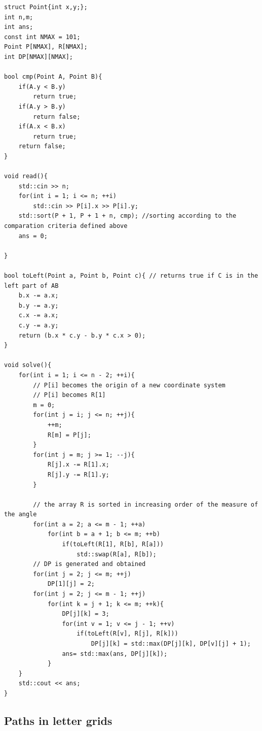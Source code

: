 \documentclass[letterpaper]{article}
\begin{document}
\begin{lstlisting}
struct Point{int x,y;};
int n,m;
int ans;
const int NMAX = 101;
Point P[NMAX], R[NMAX];
int DP[NMAX][NMAX];

bool cmp(Point A, Point B){
    if(A.y < B.y)
        return true;
    if(A.y > B.y)
        return false;
    if(A.x < B.x)
        return true;
    return false;
}

void read(){
    std::cin >> n;
    for(int i = 1; i <= n; ++i)
        std::cin >> P[i].x >> P[i].y;
    std::sort(P + 1, P + 1 + n, cmp); //sorting according to the comparation criteria defined above
    ans = 0;

}

bool toLeft(Point a, Point b, Point c){ // returns true if C is in the left part of AB
    b.x -= a.x;
    b.y -= a.y;
    c.x -= a.x;
    c.y -= a.y;
    return (b.x * c.y - b.y * c.x > 0);
}

void solve(){
    for(int i = 1; i <= n - 2; ++i){
        // P[i] becomes the origin of a new coordinate system
        // P[i] becomes R[1]
        m = 0;
        for(int j = i; j <= n; ++j){
            ++m;
            R[m] = P[j];
        }
        for(int j = m; j >= 1; --j){
            R[j].x -= R[1].x;
            R[j].y -= R[1].y;
        }

        // the array R is sorted in increasing order of the measure of the angle
        for(int a = 2; a <= m - 1; ++a)
            for(int b = a + 1; b <= m; ++b)
                if(toLeft(R[1], R[b], R[a]))
                    std::swap(R[a], R[b]);
        // DP is generated and obtained
        for(int j = 2; j <= m; ++j)
            DP[1][j] = 2;
        for(int j = 2; j <= m - 1; ++j)
            for(int k = j + 1; k <= m; ++k){
                DP[j][k] = 3;
                for(int v = 1; v <= j - 1; ++v)
                    if(toLeft(R[v], R[j], R[k]))
                        DP[j][k] = std::max(DP[j][k], DP[v][j] + 1);
                ans= std::max(ans, DP[j][k]);
            }
    }
    std::cout << ans;
}
\end{lstlisting}


\newpage

\subsection{Paths in letter grids}

\paragraph{}
\end{document}
